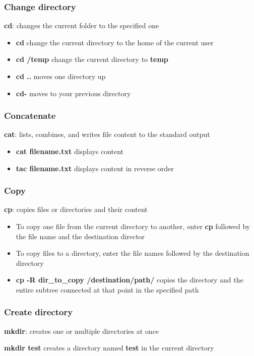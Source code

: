 \documentclass{beamer}
\begin{document}
\begin{frame}
\frametitle{Change directory}
\textbf{cd}: changes the current folder to the specified one
\newline
\begin{example}
\begin{itemize}
\item \textbf{cd} change the current directory to the home of the current user
\item \textbf{cd /temp} change the current directory to \textbf{temp}
\item \textbf{cd ..} moves one directory up
\item \textbf{cd-} moves to your previous directory
\end{itemize}
\end{example}
\end{frame}

\begin{frame}
\frametitle{Concatenate}
\textbf{cat}: lists, combines, and writes file content to the standard output
\begin{example}
\begin{itemize}
\item \textbf{cat filename.txt} displays content
\item \textbf{tac filename.txt} displays content in reverse order
\end{itemize}
\end{example}
\end{frame}

\begin{frame}
\frametitle{Copy}
\textbf{cp}: copies files or directories and their content
\begin{example}
\begin{itemize}
\item To copy one file from the current directory to another, enter \textbf{cp} followed by the file name and the destination director
\item To copy files to a directory, enter the file names followed by the destination directory
\item \textbf{cp -R dir\_to\_copy /destination/path/} copies the directory and the entire subtree connected at that point in the specified path
\end{itemize}
\end{example}
\end{frame}

\begin{frame}
\frametitle{Create directory}
\textbf{mkdir}: creates one or multiple directories at once
\begin{example}
\textbf{mkdir test} creates a directory named \textbf{test} in the current directory
\end{example}
\end{frame}
\end{document}
